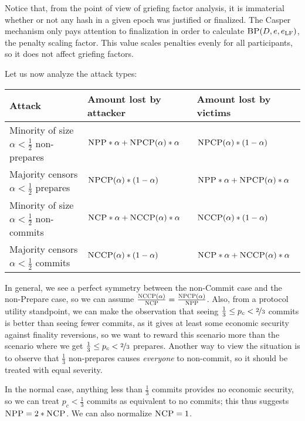 \documentclass[12pt, final]{article}
\newcommand{\epoch}{\ensuremath{e}\xspace}
\newcommand{\BP}{\textsc{BP}\xspace}
\newcommand{\NCP}{\textsc{NCP}\xspace}
\newcommand{\NCCP}{\textsc{NCCP}\xspace}
\newcommand{\NPP}{\textsc{NPP}\xspace}
\newcommand{\NPCP}{\textsc{NPCP}\xspace}
\newcommand{\epochLF}{\ensuremath{\epoch_{\textnormal{LF}}}\xspace}
\begin{document}
Notice that, from the point of view of griefing factor analysis, it is immaterial whether or not any hash in a given epoch was justified or finalized. The Casper mechanism only pays attention to finalization in order to calculate $\BP(D, \epoch, \epochLF)$, the penalty scaling factor. This value scales penalties evenly for all participants, so it does not affect griefing factors.

Let us now analyze the attack types:



\begin{table}
\renewcommand{\arraystretch}{2}
\begin{tabular}{l l l }
\toprule
\textbf{Attack} & \textbf{Amount lost by attacker} & \textbf{Amount lost by victims} \\
\midrule
Minority of size $\alpha < \frac{1}{2}$ non-prepares & $\NPP * \alpha + \NPCP(\alpha) * \alpha$ & $\NPCP(\alpha) * (1-\alpha)$ \\
Majority censors $\alpha < \frac{1}{2}$ prepares & $\NPCP(\alpha) * (1-\alpha)$ & $\NPP * \alpha + \NPCP(\alpha) * \alpha$ \\
Minority of size $\alpha < \frac{1}{2}$ non-commits & $\NCP * \alpha + \NCCP(\alpha) * \alpha$ & $\NCCP(\alpha) * (1-\alpha)$ \\
Majority censors $\alpha < \frac{1}{2}$ commits & $\NCCP(\alpha) * (1-\alpha)$ & $\NCP * \alpha + \NCCP(\alpha) * \alpha$ \\
\bottomrule
\end{tabular}
\end{table}

In general, we see a perfect symmetry between the non-Commit case and the non-Prepare case, so we can assume $\frac{\NCCP(\alpha)}{\NCP} = \frac{\NPCP(\alpha)}{\NPP}$. Also, from a protocol utility standpoint, we can make the observation that seeing $\frac{1}{3} \le p_c < \nicefrac{2}{3}$ commits is better than seeing fewer commits, as it gives at least some economic security against finality reversions, so we want to reward this scenario more than the scenario where we get $\frac{1}{3} \le p_c < \nicefrac{2}{3}$ prepares. Another way to view the situation is to observe that $\frac{1}{3}$ non-prepares causes \emph{everyone} to non-commit, so it should be treated with equal severity.

In the normal case, anything less than $\frac{1}{3}$ commits provides no economic security, so we can treat $p_c < \frac{1}{3}$ commits as equivalent to no commits; this thus suggests $\NPP = 2 * \NCP$. We can also normalize $\NCP = 1$.
\end{document}
